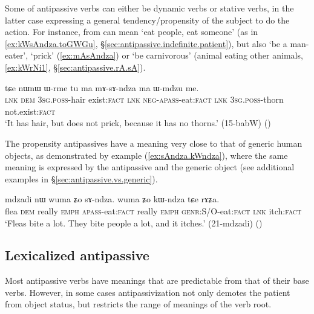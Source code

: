 Some of  antipassive verbs can either be dynamic verbs or stative verbs, in the latter case expressing a general tendency/propensity of the subject to do the action. For instance,  from  can mean `eat people, eat someone' (as in \ref{ex:kWsAndza.toGWGu}, §\ref{sec:antipassive.indefinite.patient}), but also `be a man-eater', `prick' (\ref{ex:mAsAndza}) or `be carnivorous' (animal eating other animals, \ref{ex:kWrNi1}, §\ref{sec:antipassive.rA.sA}).

\begin{exe}
\ex \label{ex:mAsAndza}
\gll tɕe nɯnɯ ɯ-rme tu ma mɤ-sɤ-ndza ma ɯ-mdzu me.  \\
\textsc{lnk} \textsc{dem} \textsc{3sg}.\textsc{poss}-hair exist:\textsc{fact} \textsc{lnk} \textsc{neg}-\textsc{apass}-eat:\textsc{fact} \textsc{lnk} \textsc{3sg}.\textsc{poss}-thorn not.exist:\textsc{fact} \\
\glt `It has hair, but does not prick, because it has no thorns.' (15-babW)
()
\end{exe}

The propensity antipassives have a meaning very close to that of generic human objects, as demonstrated by example (\ref{ex:sAndza.kWndza}), where the same meaning is expressed by the antipassive  and the generic object   (see additional examples in §\ref{sec:antipassive.vs.generic}).
 
\begin{exe}
\ex \label{ex:sAndza.kWndza}
\gll  mdzadi nɯ wuma ʑo sɤ-ndza. wuma ʑo kɯ-ndza tɕe rɤʑa. \\
flea \textsc{dem} really \textsc{emph} \textsc{apass}-eat:\textsc{fact} really \textsc{emph} \textsc{genr}:S/O-eat:\textsc{fact} \textsc{lnk} itch:\textsc{fact} \\
\glt `Fleas bite a lot. They bite people a lot, and it itches.' (21-mdzadi)
()
\end{exe}

\subsection{Lexicalized antipassive} \label{sec:antipassive.lexicalized} 
 
Most antipassive verbs have meanings that are predictable from that of their base verbs. However, in some cases antipassivization not only demotes the patient from object status, but restricts the range of meanings of the verb root.

